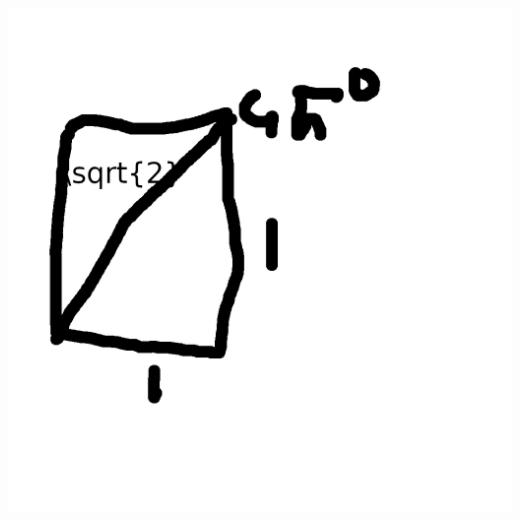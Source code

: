 \documentclass{article}
\begin{document}
  \includegraphics{Memorytrianglesquare.png}\\
  

   
\end{document}
